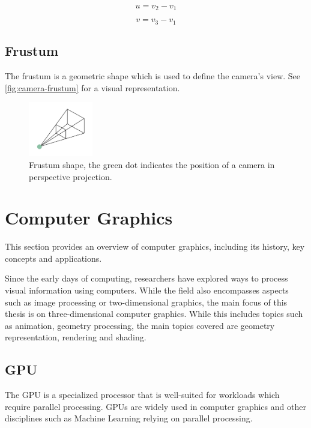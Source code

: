 \begin{equation}
  \label{eqn:triangle-vertices-to-q-u-v1}
  u = v_2 - v_1
\end{equation}

\begin{equation}
  \label{eqn:triangle-vertices-to-q-u-v2}
  v = v_3 - v_1
\end{equation}

\subsection{Frustum}

The frustum is a geometric shape which is used to define the camera's view. See \autoref{fig:camera-frustum} for a visual representation.

\begin{figure}[H]
  \centering
  \includegraphics[width=0.25\textwidth]{resources/camera-frustum.png}
  \caption{Frustum shape, the green dot indicates the position of a camera in perspective projection.}
  \label{fig:camera-frustum}
\end{figure}

\section{Computer Graphics}

This section provides an overview of computer graphics, including its history, key concepts and applications.

Since the early days of computing, researchers have explored ways to process visual information using computers. While the field also encompasses aspects such as image processing or two-dimensional graphics, the main focus of this thesis is on three-dimensional computer graphics. While this includes topics such as animation, geometry processing, the main topics covered are geometry representation, rendering and shading.

\subsection{GPU}

The GPU is a specialized processor that is well-suited for workloads which require parallel processing. GPUs are widely used in computer graphics and other disciplines such as Machine Learning relying on parallel processing.

